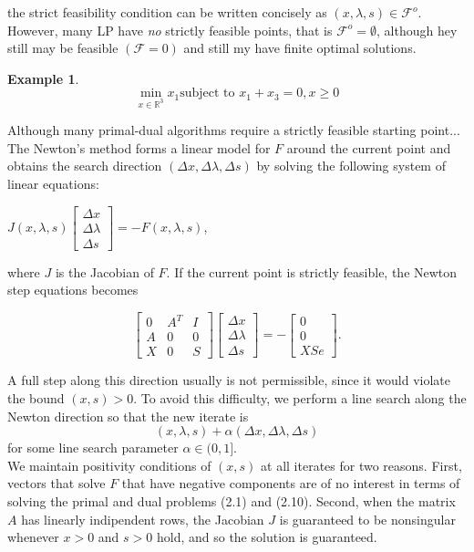 \documentclass[a4paper,10 pt,titlepage,twoside]{book}
\theoremstyle{plain}
\theoremstyle{definition}
\newtheorem{ex}[thm]{Example}
\theoremstyle{remark}
\begin{document}
the strict feasibility condition can be written concisely as $(x,\lambda,s)\in\mathcal{F}^{o}$.\\
However, many LP have \textit{no} strictly feasible points, that is $\mathcal{F}^{o}=\emptyset$, although hey still may be feasible $(\mathcal{F}=0)$ and still my have finite optimal solutions.
\begin{ex}
	\begin{equation*}
	\min\limits_{x\in\mathbb{R}^{3}} x_{1} \text{subject to }x_{1} + x_{3} = 0, x\geq0
	\end{equation*}
\end{ex}
Although many primal-dual algorithms require a strictly feasible starting point...
The Newton's method forms a linear model for $\mathit{F}$ around the current point and obtains the search direction $(\Delta x,\Delta \lambda,\Delta s)$ by solving the following system of linear equations:
\begin{center}
	$\mathit{J}(x,\lambda,s)\begin{bmatrix}
	\Delta x\\\Delta\lambda \\\Delta s
	\end{bmatrix}=-\mathit{F}(x,\lambda,s)$,
\end{center}
where $\mathit{J}$ is the Jacobian of $\mathit{F}$. If the current point is strictly feasible, the Newton step equations becomes

\begin{equation}\label{(5.1)}
	\begin{bmatrix}
0&A^{T}&I \\A&0&0\\X&0&S
	\end{bmatrix}\begin{bmatrix}
	\Delta x\\\Delta\lambda \\\Delta s
	\end{bmatrix}=-\begin{bmatrix}
	0\\0\\XSe
	\end{bmatrix}.
\end{equation}

A full step along this direction usually is not permissible, since it would violate the bound $(x,s)>0$. To avoid this difficulty, we perform a line search along the Newton direction so that the new iterate is
\begin{equation*}
	(x,\lambda,s) +\alpha (\Delta x,\Delta \lambda,\Delta s)
\end{equation*} 
for some line search parameter $\alpha \in (0,1]$. \\We maintain positivity conditions of $(x,s)$ at all iterates for two reasons. First, vectors that solve $\mathit{F}$ that have negative components are of no interest in terms of solving the primal and dual problems (2.1) and (2.10). Second, when the matrix $A$ has linearly indipendent rows, the Jacobian $J$ is guaranteed to be nonsingular whenever $x>0$ and $s>0$ hold, and so the solution is guaranteed.
\end{document}
